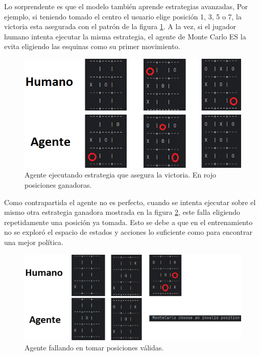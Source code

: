 Lo sorprendente es que el modelo también aprende estrategias avanzadas, Por ejemplo, si teniendo tomado el centro el usuario elige posición 1, 3, 5 o 7, la victoria esta asegurada con el patrón de la figura \ref{fig:monte_carlo_advanced}. A la vez, si el jugador humano intenta ejecutar la misma estrategia, el agente de Monte Carlo ES la evita eligiendo las esquinas como su primer movimiento.

\begin{figure}[htbp]
	\centering
	\includegraphics[width=\textwidth]{./Figures/monte_carlo_advanced.png}
	\caption{Agente ejecutando estrategia que asegura la victoria. En rojo posiciones ganadoras.}
	\label{fig:monte_carlo_advanced}
\end{figure}

Como contrapartida el agente no es perfecto, cuando se intenta ejecutar sobre el mismo otra estrategia ganadora mostrada en la figura \ref{fig:monte_carlo_exception}, este falla eligiendo repetidamente una posición ya tomada. Esto se debe a que en el entrenamiento no se exploró el espacio de estados y acciones lo suficiente como para encontrar una mejor política.

\begin{figure}[htbp]
	\centering
	\includegraphics[width=\textwidth]{./Figures/monte_carlo_exception.png}
	\caption{Agente fallando en tomar posiciones válidas.}
	\label{fig:monte_carlo_exception}
\end{figure}

